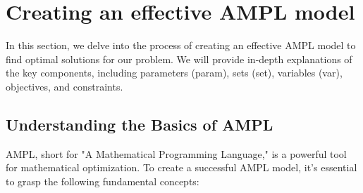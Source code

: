\section{Creating an effective AMPL model}\label{sec:AMPL_MODELS}

In this section, we delve into the process of creating an effective AMPL model to find optimal solutions for our problem. We will provide in-depth explanations of the key components, including parameters (param), sets (set), variables (var), objectives, and constraints.

\subsection{Understanding the Basics of AMPL}

AMPL, short for "A Mathematical Programming Language," is a powerful tool for mathematical optimization. To create a successful AMPL model, it's essential to grasp the following fundamental concepts:
